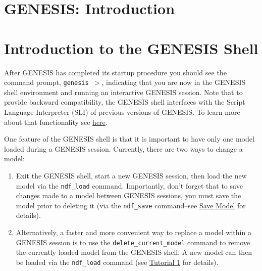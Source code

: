 \documentclass[12pt]{article}
\begin{document}
\section*{GENESIS: Introduction}

\section*{Introduction to the GENESIS Shell}

After GENESIS has completed its startup procedure you should see the command prompt, {\tt genesis $>$}, indicating that you are now in the GENESIS shell environment and running an interactive GENESIS session. Note that to provide backward compatibility, the GENESIS shell interfaces with the Script Language Interpreter (SLI) of previous versions of GENESIS. To learn more about that functionality see \href{../backward-compatibility/backward-compatibility.pdf}{here}.

One feature of the GENESIS shell is that it is important to have only one model loaded during a GENESIS session. Currently, there are two ways to change a model:

\begin{enumerate}

\item Exit the GENESIS shell, start a new GENESIS session, then load the new model  via the {\tt ndf\_load} command. Importantly, don't forget that to save changes made to a model between GENESIS sessions, you must save the model prior to deleting it (via the {\tt ndf\_save} command--see \href{../tutorial1/tutorial1.pdf}{Save Model} for details).

\item Alternatively, a faster and more convenient way to replace a model within a GENESIS session is to use the {\tt delete\_current\_model} command to remove the currently loaded model from the GENESIS shell. A new model can then be loaded via the {\tt ndf\_load} command (see \href{../tutorial1/tutorial1.pdf}{Tutorial 1} for details).

\end{enumerate}
\end{document}
